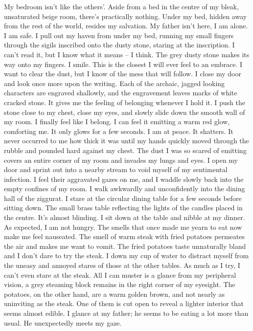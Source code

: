 \documentclass[openany, 12pt]{book}
\newcommand\tab[1][1cm]{\hspace*{#1}}
\begin{document}
My bedroom isn’t like the others’. Aside from a bed in the centre of my bleak, unsaturated beige room, there’s practically nothing. Under my bed, hidden away from the rest of the world, resides my salvation. My father isn’t here, I am alone. I am safe. I pull out my haven from under my bed, running my small fingers through the sigils inscribed onto the dusty stone, staring at the inscription. I can’t read it, but I know what it means – I think. The grey dusty stone makes its way onto my fingers. I smile. This is the closest I will ever feel to an embrace. I want to clear the dust, but I know of the mess that will follow. I close my door and look once more upon the writing. Each of the archaic, jagged looking characters are engraved  shallowly, and the engravement leaves marks of white cracked stone. It gives me the feeling of belonging whenever I hold it. I push the stone close to my chest, close my eyes, and slowly slide down the smooth wall of my room. I finally feel like I belong. I can feel it emitting a warm red glow, comforting me. It only glows for a few seconds. I am at peace. It shatters. It never occurred to me how thick it was until my hands quickly moved through the rubble and pounded hard against my chest. The dust I was so scared of emitting covers an entire corner of my room and invades my lungs and eyes. I open my door and sprint out into a nearby stream to void myself of my sentimental infection. I feel their aggravated gazes on me, and I waddle slowly back into the empty confines of my room.
\newline
\tab
\tab
I walk awkwardly and unconfidently into the dining hall of the ziggurat. I stare at the circular dining table for a few seconds before sitting down. The small brass table reflecting the lights of the candles placed in the centre. It’s almost blinding. I sit down at the table and nibble at my dinner. As expected, I am not hungry. The smells that once made me yearn to eat now make me feel nauseated. The smell of warm steak with fried potatoes permeates the air and makes me want to vomit. The fried potatoes taste unnaturally bland and I don’t dare to try the steak. I down my cup of water to distract myself from the uneasy and annoyed stares of those at the other tables. As much as I try, I can’t even stare at the steak. All I can muster is a glance from my peripheral vision, a grey steaming block remains in the right corner of my eyesight. The potatoes, on the other hand, are a warm golden brown, and not nearly as uninviting as the steak. One of them is cut open to reveal a lighter interior that seems almost edible. I glance at my father; he seems to be eating a lot more than usual. He unexpectedly meets my gaze.
\end{document}
